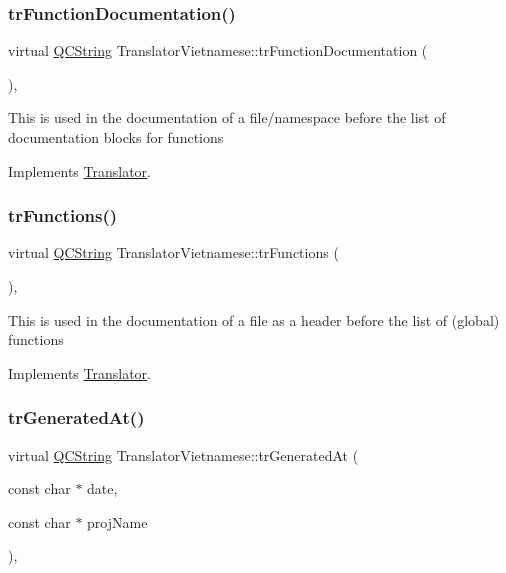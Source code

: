 \subsubsection{\texorpdfstring{trFunctionDocumentation()}{trFunctionDocumentation()}}
{\footnotesize\ttfamily virtual \mbox{\hyperlink{class_q_c_string}{Q\+C\+String}} Translator\+Vietnamese\+::tr\+Function\+Documentation (\begin{DoxyParamCaption}{ }\end{DoxyParamCaption})\hspace{0.3cm}{\ttfamily [inline]}, {\ttfamily [virtual]}}

This is used in the documentation of a file/namespace before the list of documentation blocks for functions 

Implements \mbox{\hyperlink{class_translator}{Translator}}.

\mbox{\label{class_translator_vietnamese_a37bc2e03217110ca185bf2c056b8f62e}} 
\subsubsection{\texorpdfstring{trFunctions()}{trFunctions()}}
{\footnotesize\ttfamily virtual \mbox{\hyperlink{class_q_c_string}{Q\+C\+String}} Translator\+Vietnamese\+::tr\+Functions (\begin{DoxyParamCaption}{ }\end{DoxyParamCaption})\hspace{0.3cm}{\ttfamily [inline]}, {\ttfamily [virtual]}}

This is used in the documentation of a file as a header before the list of (global) functions 

Implements \mbox{\hyperlink{class_translator}{Translator}}.

\mbox{\label{class_translator_vietnamese_a0a75e47a72f6df8dd802cb6e96b72b54}} 
\subsubsection{\texorpdfstring{trGeneratedAt()}{trGeneratedAt()}}
{\footnotesize\ttfamily virtual \mbox{\hyperlink{class_q_c_string}{Q\+C\+String}} Translator\+Vietnamese\+::tr\+Generated\+At (\begin{DoxyParamCaption}\item[{const char $\ast$}]{date,  }\item[{const char $\ast$}]{proj\+Name }\end{DoxyParamCaption})\hspace{0.3cm}{\ttfamily [inline]}, {\ttfamily [virtual]}}

